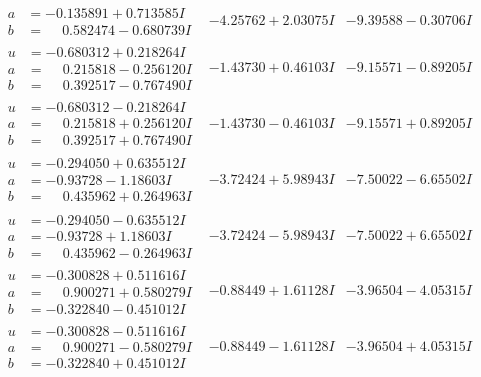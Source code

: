 \documentclass[1p]{elsarticle_modified}
\theoremstyle{definition}
\begin{document}
$$\begin{array}{c|c|c}
\begin{aligned}
a &= -0.135891 + 0.713585 I \\
b &= \phantom{-}0.582474 - 0.680739 I\end{aligned}
 & -4.25762 + 2.03075 I & -9.39588 - 0.30706 I \\ \hline\begin{aligned}
u &= -0.680312 + 0.218264 I \\
a &= \phantom{-}0.215818 - 0.256120 I \\
b &= \phantom{-}0.392517 - 0.767490 I\end{aligned}
 & -1.43730 + 0.46103 I & -9.15571 - 0.89205 I \\ \hline\begin{aligned}
u &= -0.680312 - 0.218264 I \\
a &= \phantom{-}0.215818 + 0.256120 I \\
b &= \phantom{-}0.392517 + 0.767490 I\end{aligned}
 & -1.43730 - 0.46103 I & -9.15571 + 0.89205 I \\ \hline\begin{aligned}
u &= -0.294050 + 0.635512 I \\
a &= -0.93728 - 1.18603 I \\
b &= \phantom{-}0.435962 + 0.264963 I\end{aligned}
 & -3.72424 + 5.98943 I & -7.50022 - 6.65502 I \\ \hline\begin{aligned}
u &= -0.294050 - 0.635512 I \\
a &= -0.93728 + 1.18603 I \\
b &= \phantom{-}0.435962 - 0.264963 I\end{aligned}
 & -3.72424 - 5.98943 I & -7.50022 + 6.65502 I \\ \hline\begin{aligned}
u &= -0.300828 + 0.511616 I \\
a &= \phantom{-}0.900271 + 0.580279 I \\
b &= -0.322840 - 0.451012 I\end{aligned}
 & -0.88449 + 1.61128 I & -3.96504 - 4.05315 I \\ \hline\begin{aligned}
u &= -0.300828 - 0.511616 I \\
a &= \phantom{-}0.900271 - 0.580279 I \\
b &= -0.322840 + 0.451012 I\end{aligned}
 & -0.88449 - 1.61128 I & -3.96504 + 4.05315 I \\ \hline\begin{aligned}

\end{aligned}
\end{array}$$
\end{document}
